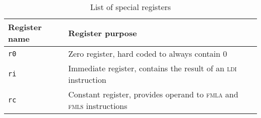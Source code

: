 \begin{table}[H]
	\centering
	\begin{tabular}{|l l|}
		\hline
		\textbf{Register name} & \textbf{Register purpose} \\
		\hline
		\texttt{r0} & Zero register, hard coded to always contain 0 \\
		\texttt{ri} & Immediate register, contains the result of an \textsc{ldi} instruction\\
		\texttt{rc} & Constant register, provides operand to \textsc{fmla} and \textsc{fmls} instructions \\
		\hline
	\end{tabular}

	\caption{List of special registers}
	\label{tab:specregs}
\end{table}

